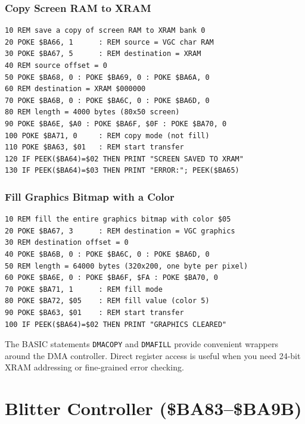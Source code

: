 \subsubsection{Copy Screen RAM to XRAM}

\begin{lstlisting}
10 REM save a copy of screen RAM to XRAM bank 0
20 POKE $BA66, 1      : REM source = VGC char RAM
30 POKE $BA67, 5      : REM destination = XRAM
40 REM source offset = 0
50 POKE $BA68, 0 : POKE $BA69, 0 : POKE $BA6A, 0
60 REM destination = XRAM $000000
70 POKE $BA6B, 0 : POKE $BA6C, 0 : POKE $BA6D, 0
80 REM length = 4000 bytes (80x50 screen)
90 POKE $BA6E, $A0 : POKE $BA6F, $0F : POKE $BA70, 0
100 POKE $BA71, 0     : REM copy mode (not fill)
110 POKE $BA63, $01   : REM start transfer
120 IF PEEK($BA64)=$02 THEN PRINT "SCREEN SAVED TO XRAM"
130 IF PEEK($BA64)=$03 THEN PRINT "ERROR:"; PEEK($BA65)
\end{lstlisting}

\subsubsection{Fill Graphics Bitmap with a Color}

\begin{lstlisting}
10 REM fill the entire graphics bitmap with color $05
20 POKE $BA67, 3      : REM destination = VGC graphics
30 REM destination offset = 0
40 POKE $BA6B, 0 : POKE $BA6C, 0 : POKE $BA6D, 0
50 REM length = 64000 bytes (320x200, one byte per pixel)
60 POKE $BA6E, 0 : POKE $BA6F, $FA : POKE $BA70, 0
70 POKE $BA71, 1      : REM fill mode
80 POKE $BA72, $05    : REM fill value (color 5)
90 POKE $BA63, $01    : REM start transfer
100 IF PEEK($BA64)=$02 THEN PRINT "GRAPHICS CLEARED"
\end{lstlisting}

\begin{tipbox}
The BASIC statements \texttt{DMACOPY} and \texttt{DMAFILL} provide
convenient wrappers around the DMA controller.  Direct register access
is useful when you need 24-bit XRAM addressing or fine-grained error
checking.
\end{tipbox}


\section{Blitter Controller (\$BA83--\$BA9B)}
\label{sec:blitter}

